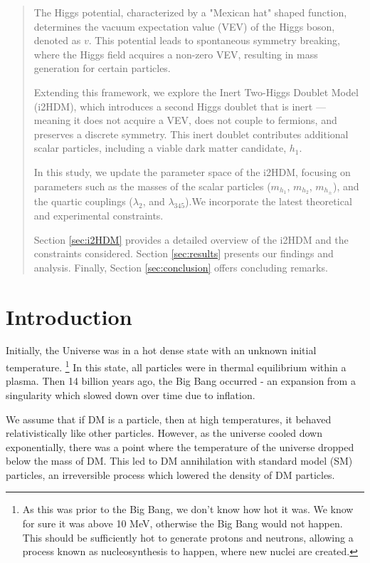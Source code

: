 \documentclass[12pt]{article}
\begin{document}
\newpage
\thispagestyle{empty}
\begin{abstract}
The Higgs potential, characterized by a "Mexican hat" shaped function, determines the vacuum expectation value (VEV) of the Higgs boson, denoted as $v$. This potential leads to spontaneous symmetry breaking, where the Higgs field acquires a non-zero VEV, resulting in mass generation for certain particles.

Extending this framework, we explore the Inert Two-Higgs Doublet Model (i2HDM), which introduces a second Higgs doublet that is inert — meaning it does not acquire a VEV, does not couple to fermions, and preserves a discrete symmetry. This inert doublet contributes additional scalar particles, including a viable dark matter candidate, $h_1$.

In this study, we update the parameter space of the i2HDM, focusing on parameters such as the masses of the scalar particles ($m_{h_1}$, $m_{h_2}$, $m_{h_\pm}$), and the quartic couplings ($\lambda_2$, and $\lambda_{345}$).We incorporate the latest theoretical and experimental constraints.

Section \ref{sec:i2HDM} provides a detailed overview of the i2HDM and the constraints considered. Section \ref{sec:results} presents our findings and analysis. Finally, Section \ref{sec:conclusion} offers concluding remarks.

\end{abstract}

\newpage

\onehalfspacing
\setcounter{page}{1}
\section{Introduction}
\label{sec:introduction}
Initially, the Universe was in a hot dense state with an unknown initial temperature. \footnote{As this was prior to the Big Bang, we don't know how hot it was. We know for sure it was above 10 MeV, otherwise the Big Bang would not happen. This should be sufficiently hot to generate protons and neutrons, allowing a process known as nucleosynthesis to happen, where new nuclei are created.} In this state, all particles were in thermal equilibrium within a plasma. Then 14 billion years ago, the Big Bang occurred - an expansion from a singularity which slowed down over time due to inflation.

We assume that if DM is a particle, then at high temperatures, it behaved relativistically like other particles. However, as the universe cooled down exponentially, there was a point where the temperature of the universe dropped below the mass of DM. This led to DM annihilation with standard model (SM) particles, an irreversible process which lowered the density of DM particles. 
\end{document}
